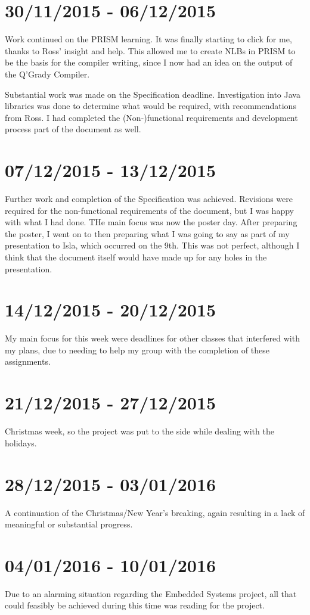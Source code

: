 \documentclass[11pt, a4paper]{article}
\begin{document}
\section{30/11/2015 - 06/12/2015}
Work continued on the PRISM learning. It was finally starting to click for me,
thanks to Ross' insight and help. This allowed me to create NLBs in PRISM to be
the basis for the compiler writing, since I now had an idea on the output of the
Q'Grady Compiler.

Substantial work was made on the Specification deadline. Investigation into Java
libraries was done to determine what would be required, with recommendations
from Ross. I had completed the (Non-)functional requirements and development
process part of the document as well.

\section{07/12/2015 - 13/12/2015}
Further work and completion of the Specification was achieved. Revisions were
required for the non-functional requirements of the document, but I was happy
with what I had done. THe main focus was now the poster day. After preparing the
poster, I went on to then preparing what I was going to say as part of my
presentation to Isla, which occurred on the 9th. This was not perfect, although
I think that the document itself would have made up for any holes in the
presentation.

\section{14/12/2015 - 20/12/2015}
My main focus for this week were deadlines for other classes that interfered
with my plans, due to needing to help my group with the completion of these
assignments.

\section{21/12/2015 - 27/12/2015}
Christmas week, so the project was put to the side while dealing with the
holidays.

\section{28/12/2015 - 03/01/2016}
A continuation of the Christmas/New Year's breaking, again resulting in a lack
of meaningful or substantial progress.

\section{04/01/2016 - 10/01/2016}
Due to an alarming situation regarding the Embedded Systems project, all that
could feasibly be achieved during this time was reading for the project.
\end{document}
